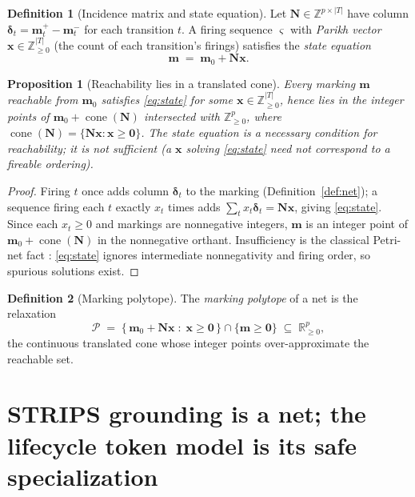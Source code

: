 \documentclass[11pt,oneside]{book}
\theoremstyle{definition}
\newtheorem{definition}{Definition}[chapter]
\theoremstyle{plain}
\newtheorem{proposition}[theorem]{Proposition}
\theoremstyle{remark}
\DeclareMathOperator{\cone}{cone}
\newcommand{\Poly}{\mathcal{P}}                %
\newcommand{\Nmat}{\mathbf{N}}                 %
\newcommand{\Zplus}{\mathbb{Z}_{\ge 0}}
\newcommand{\Rplus}{\mathbb{R}_{\ge 0}}
\begin{document}
\begin{definition}[Incidence matrix and state equation]\label{def:incidence}
Let $\Nmat\in\mathbb{Z}^{p\times|T|}$ have column $\bm\delta_t=\bm m^{+}_{t}-\bm m^{-}_{t}$ for
each transition $t$. A firing sequence $\varsigma$ with \emph{Parikh vector} $\bm x\in\Zplus^{|T|}$
(the count of each transition's firings) satisfies the \emph{state equation}
\begin{equation}\label{eq:state}
\bm m \;=\; \bm m_{0} + \Nmat\bm x .
\end{equation}
\end{definition}

\begin{proposition}[Reachability lies in a translated cone]\label{prop:cone}
Every marking $\bm m$ reachable from $\bm m_{0}$ satisfies \eqref{eq:state} for some
$\bm x\in\Zplus^{|T|}$, hence lies in the integer points of
$\bm m_{0}+\cone(\Nmat)$ intersected with $\Zplus^{p}$, where
$\cone(\Nmat)=\{\Nmat\bm x:\bm x\ge\bm 0\}$. The state equation is a \emph{necessary}
condition for reachability; it is not sufficient (a $\bm x$ solving \eqref{eq:state} need not
correspond to a fireable ordering).
\end{proposition}

\begin{proof}
Firing $t$ once adds column $\bm\delta_t$ to the marking (Definition~\ref{def:net}); a sequence
firing each $t$ exactly $x_t$ times adds $\sum_t x_t\bm\delta_t=\Nmat\bm x$, giving
\eqref{eq:state}. Since each $x_t\ge0$ and markings are nonnegative integers, $\bm m$ is an
integer point of $\bm m_{0}+\cone(\Nmat)$ in the nonnegative orthant. Insufficiency is the
classical Petri-net fact \cite{murata1989}: \eqref{eq:state} ignores intermediate
nonnegativity and firing order, so spurious solutions exist. \end{proof}

\begin{definition}[Marking polytope]\label{def:polytope}
The \emph{marking polytope} of a net is the relaxation
\[
\Poly \;=\; \bigl\{\,\bm m_{0}+\Nmat\bm x \;:\; \bm x\ge\bm 0\,\bigr\}\cap\{\bm m\ge\bm 0\}
\;\subseteq\;\Rplus^{p},
\]
the continuous translated cone whose integer points over-approximate the reachable set.
\end{definition}

\section{STRIPS grounding is a net; the lifecycle token model is its safe specialization}
\end{document}
